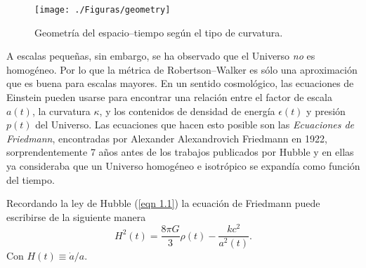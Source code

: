 \documentclass[a4paper,openright,12pt]{book}
\begin{document}
\begin{figure}
\centering
\texttt{[image: ./Figuras/geometry]}
\caption{\footnotesize{Geometría del espacio--tiempo según el tipo de curvatura.}}
\end{figure}

A escalas pequeñas, sin embargo, se ha observado que el Universo \textit{no} es homogéneo. Por lo que la métrica de Robertson--Walker es sólo una aproximación que es buena para escalas mayores. En un sentido cosmológico, las ecuaciones de Einstein pueden usarse para encontrar una relación entre el factor de escala $a(t)$, la curvatura $\kappa$, y los contenidos de densidad de energía $\epsilon(t)$ y presión $p(t)$ del Universo. Las ecuaciones que hacen esto posible son las \textit{Ecuaciones de Friedmann}, encontradas por Alexander Alexandrovich Friedmann en 1922, sorprendentemente 7 años antes de los trabajos publicados por Hubble y en ellas ya consideraba que un Universo homogéneo e isotrópico se expandía como función del tiempo. 

Recordando la ley de Hubble (\ref{eqn 1.1}) la ecuación de Friedmann puede escribirse de la siguiente manera
\begin{equation}
H^{2}(t) = \frac{8 \pi G}{3}\rho(t) 
-\frac{k c^{2}}{a^{2}(t)}.\label{eqn 1.19}
\end{equation}
Con $H(t) \equiv \dot{a}/a$.
\end{document}
